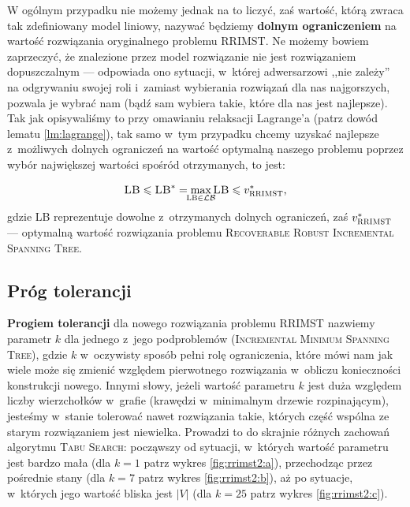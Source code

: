 W ogólnym przypadku nie możemy jednak na to liczyć, zaś wartość, którą zwraca tak zdefiniowany model liniowy, nazywać będziemy \textbf{dolnym ograniczeniem} na wartość rozwiązania oryginalnego problemu \textsc{RRIMST}. Ne możemy bowiem zaprzeczyć, że znalezione przez model rozwiązanie nie jest rozwiązaniem dopuszczalnym --- odpowiada ono sytuacji, w~której adwersarzowi ,,nie zależy'' na odgrywaniu swojej roli i~zamiast wybierania rozwiązań dla nas najgorszych, pozwala je wybrać nam (bądź sam wybiera takie, które dla nas jest najlepsze). Tak jak opisywaliśmy to przy omawianiu relaksacji Lagrange'a (patrz dowód lematu \ref{lm:lagrange}), tak samo w~tym przypadku chcemy uzyskać najlepsze z~możliwych dolnych ograniczeń na wartość optymalną naszego problemu poprzez wybór największej wartości spośród otrzymanych, to jest:

\begin{equation}
\textsc{LB} \leqslant \textsc{LB}^{\ast} = \max_{\mathclap{\textsc{LB} \in \mathcal{LB}}} \textsc{LB} \leqslant v_{\textsc{RRIMST}}^{\ast}\text{,}
\end{equation}
gdzie \textsc{LB} reprezentuje dowolne z~otrzymanych dolnych ograniczeń, zaś $v_{\textsc{RRIMST}}^{\ast}$ --- optymalną wartość rozwiązania problemu \textsc{Recoverable Robust Incremental Spanning Tree}.

\subsection{Próg tolerancji}

\textbf{Progiem tolerancji} dla nowego rozwiązania problemu \textsc{RRIMST} nazwiemy parametr $k$ dla jednego z~jego podproblemów (\textsc{Incremental Minimum Spanning Tree}), gdzie $k$ w~oczywisty sposób pełni rolę ograniczenia, które mówi nam jak wiele może się zmienić względem pierwotnego rozwiązania w~obliczu konieczności konstrukcji nowego. Innymi słowy, jeżeli wartość parametru $k$ jest duża względem liczby wierzchołków w~grafie (krawędzi w~minimalnym drzewie rozpinającym), jesteśmy w~stanie tolerować nawet rozwiązania takie, których część wspólna ze starym rozwiązaniem jest niewielka. Prowadzi to do skrajnie różnych zachowań algorytmu \textsc{Tabu Search}: począwszy od sytuacji, w~których wartość parametru jest bardzo mała (dla $k = 1$ patrz wykres \ref{fig:rrimst2:a}), przechodząc przez pośrednie stany (dla $k = 7$ patrz wykres \ref{fig:rrimst2:b}), aż po sytuacje, w~których jego wartość bliska jest $\left| V \right|$ (dla $k = 25$ patrz wykres \ref{fig:rrimst2:c}).

